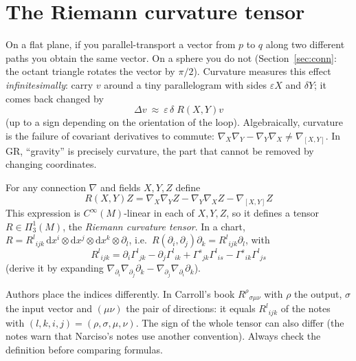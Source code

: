 \documentclass[11pt,a4paper]{article}
\numberwithin{equation}{section}
\theoremstyle{definition}
\theoremstyle{plain}
\newcommand{\dd}{\mathrm{d}}
\newcommand{\TF}[2]{\Pi^{#1}_{#2}}                  %
\begin{document}
\section{The Riemann curvature tensor}\label{sec:curv}

\begin{intuition}[{curvature = failure of parallel transport to be path independent}]
On a flat plane, if you parallel-transport a vector from $p$ to $q$ along two different paths you obtain the same vector. On a sphere you do not (Section~\ref{sec:conn}: the octant triangle rotates the vector by $\pi/2$). Curvature measures this effect \emph{infinitesimally}: carry $v$ around a tiny parallelogram with sides $\varepsilon X$ and $\delta Y$; it comes back changed by
\[
\Delta v\ \approx\ \varepsilon\,\delta\; R(X,Y)v
\]
(up to a sign depending on the orientation of the loop). Algebraically, curvature is the failure of covariant derivatives to commute: $\nabla_X\nabla_Y-\nabla_Y\nabla_X\neq\nabla_{[X,Y]}$. In GR, ``gravity'' is precisely curvature, the part that cannot be removed by changing coordinates.
\end{intuition}

\begin{formal}
For any connection $\nabla$ and fields $X,Y,Z$ define
\[
\boxed{\ R(X,Y)Z=\nabla_X\nabla_YZ-\nabla_Y\nabla_XZ-\nabla_{[X,Y]}Z\ }
\]
This expression is $C^\infty(M)$-linear in each of $X,Y,Z$, so it defines a tensor $R\in\TF{1}{3}(M)$, the \emph{Riemann curvature tensor}. In a chart, $R=R^l{}_{ijk}\,\dd x^i\otimes\dd x^j\otimes\dd x^k\otimes\partial_l$, i.e.\ $R(\partial_i,\partial_j)\partial_k=R^l{}_{ijk}\partial_l$, with
\begin{equation}\label{eq:riemanncomp}
\boxed{\ R^l{}_{ijk}=\partial_i\Gamma^l{}_{jk}-\partial_j\Gamma^l{}_{ik}+\Gamma^s{}_{jk}\Gamma^l{}_{is}-\Gamma^s{}_{ik}\Gamma^l{}_{js}\ }
\end{equation}
(derive it by expanding $\nabla_{\partial_i}\nabla_{\partial_j}\partial_k-\nabla_{\partial_j}\nabla_{\partial_i}\partial_k$). 
\end{formal}
\begin{pitfall}
Authors place the indices differently. In Carroll's book $R^\rho{}_{\sigma\mu\nu}$ with $\rho$ the output, $\sigma$ the input vector and $(\mu\nu)$ the pair of directions: it equals $R^l{}_{ijk}$ of the notes with $(l,k,i,j)=(\rho,\sigma,\mu,\nu)$. The sign of the whole tensor can also differ (the notes warn that Narciso's notes use another convention). Always check the definition before comparing formulas.
\end{pitfall}
\end{document}
